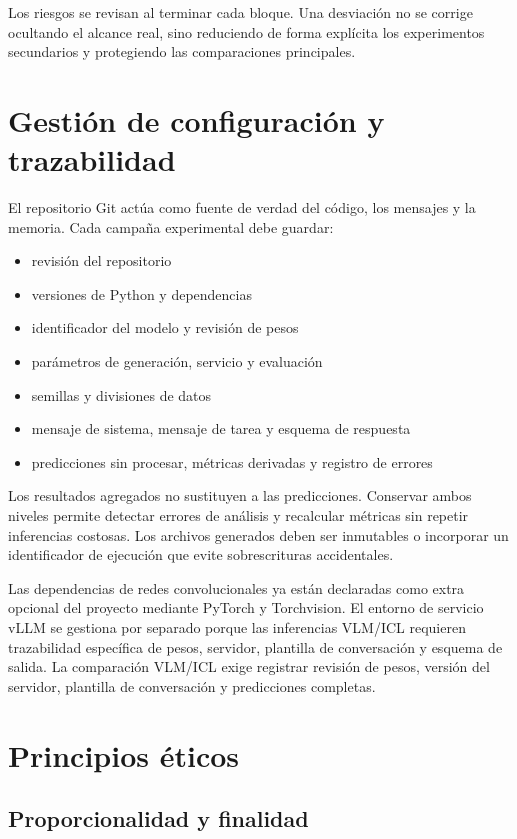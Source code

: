 Los riesgos se revisan al terminar cada bloque. Una desviación no se corrige ocultando el alcance real, sino reduciendo de forma explícita los experimentos secundarios y protegiendo las comparaciones principales.

\section{Gestión de configuración y trazabilidad}

El repositorio Git actúa como fuente de verdad del código, los mensajes y la memoria. Cada campaña experimental debe guardar:

\begin{itemize}
  \item revisión del repositorio
  \item versiones de Python y dependencias
  \item identificador del modelo y revisión de pesos
  \item parámetros de generación, servicio y evaluación
  \item semillas y divisiones de datos
  \item mensaje de sistema, mensaje de tarea y esquema de respuesta
  \item predicciones sin procesar, métricas derivadas y registro de errores
\end{itemize}

Los resultados agregados no sustituyen a las predicciones. Conservar ambos niveles permite detectar errores de análisis y recalcular métricas sin repetir inferencias costosas. Los archivos generados deben ser inmutables o incorporar un identificador de ejecución que evite sobrescrituras accidentales.

Las dependencias de redes convolucionales ya están declaradas como extra opcional del proyecto mediante PyTorch y Torchvision. El entorno de servicio vLLM se gestiona por separado porque las inferencias VLM/ICL requieren trazabilidad específica de pesos, servidor, plantilla de conversación y esquema de salida. La comparación VLM/ICL exige registrar revisión de pesos, versión del servidor, plantilla de conversación y predicciones completas.

\section{Principios éticos}

\subsection{Proporcionalidad y finalidad}

